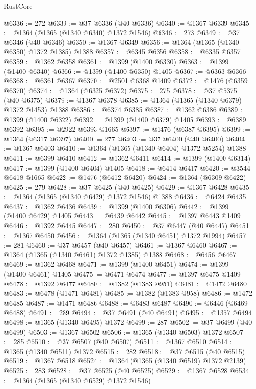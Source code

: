 \begin{lexlean}{RustCore}
\begin{coremodule}
@6336 := 272
@6339 := @37 @6336 (@40 @6336)
@6340 := @1367 @6339
@6345 := @1364 (@1365 (@1340 @6340) @1372 @1546)
@6346 := 273
@6349 := @37 @6346 (@40 @6346)
@6350 := @1367 @6349
@6356 := @1364 (@1365 (@1340 @6350) @1372 @1385) @1388
@6357 := @6345 @6356
@6358 := @6335 @6357
@6359 := @1362 @6358
@6361 := @1399 (@1400 @6330)
@6363 := @1399 (@1400 @6340)
@6366 := @1399 (@1400 @6350) @1405
@6367 := @6363 @6366
@6368 := @6361 @6367
@6370 := @2501 @6368 @1409
@6372 := @1476 (@6359 @6370)
@6374 := @1364 (@6325 @6372)
@6375 := 275
@6378 := @37 @6375 (@40 @6375)
@6379 := @1367 @6378
@6385 := @1364 (@1365 (@1340 @6379) @1372 @1453) @1388
@6386 := @6374 @6385
@6387 := @1362 @6386
@6389 := @1399 (@1400 @6322)
@6392 := @1399 (@1400 @6379) @1405
@6393 := @6389 @6392
@6395 := @2922 @6393 @1665
@6397 := @1476 (@6387 @6395)
@6399 := @1364 (@6317 @6397)
@6400 := 277
@6403 := @37 @6400 (@40 @6400)
@6404 := @1367 @6403
@6410 := @1364 (@1365 (@1340 @6404) @1372 @5254) @1388
@6411 := @6399 @6410
@6412 := @1362 @6411
@6414 := @1399 (@1400 @6314)
@6417 := @1399 (@1400 @6404) @1405
@6418 := @6414 @6417
@6420 := @3544 @6418 @1665
@6422 := @1476 (@6412 @6420)
@6424 := @1364 (@6309 @6422)
@6425 := 279
@6428 := @37 @6425 (@40 @6425)
@6429 := @1367 @6428
@6435 := @1364 (@1365 (@1340 @6429) @1372 @1546) @1388
@6436 := @6424 @6435
@6437 := @1362 @6436
@6439 := @1399 (@1400 @6306)
@6442 := @1399 (@1400 @6429) @1405
@6443 := @6439 @6442
@6445 := @1397 @6443 @1409
@6446 := @1392 @6445
@6447 := 280
@6450 := @37 @6447 (@40 @6447)
@6451 := @1367 @6450
@6456 := @1364 (@1365 (@1340 @6451) @1372 @1994)
@6457 := 281
@6460 := @37 @6457 (@40 @6457)
@6461 := @1367 @6460
@6467 := @1364 (@1365 (@1340 @6461) @1372 @1385) @1388
@6468 := @6456 @6467
@6469 := @1362 @6468
@6471 := @1399 (@1400 @6451)
@6474 := @1399 (@1400 @6461) @1405
@6475 := @6471 @6474
@6477 := @1397 @6475 @1409
@6478 := @1392 @6477
@6480 := @1382 (@1383 @951)
@6481 := @1472 @6480
@6483 := @6478 (@1471 @6481)
@6485 := @1382 (@1383 @958)
@6486 := @1472 @6485
@6487 := @1471 @6486
@6488 := @6483 @6487
@6490 := @6446 (@6469 @6488)
@6491 := 289
@6494 := @37 @6491 (@40 @6491)
@6495 := @1367 @6494
@6498 := @1365 (@1340 @6495) @1372
@6499 := 287
@6502 := @37 @6499 (@40 @6499)
@6503 := @1367 @6502
@6506 := @1365 (@1340 @6503) @1372
@6507 := 285
@6510 := @37 @6507 (@40 @6507)
@6511 := @1367 @6510
@6514 := @1365 (@1340 @6511) @1372
@6515 := 282
@6518 := @37 @6515 (@40 @6515)
@6519 := @1367 @6518
@6524 := @1364 (@1365 (@1340 @6519) @1372 @2139)
@6525 := 283
@6528 := @37 @6525 (@40 @6525)
@6529 := @1367 @6528
@6534 := @1364 (@1365 (@1340 @6529) @1372 @1546)

\end{coremodule}
\end{lexlean}
